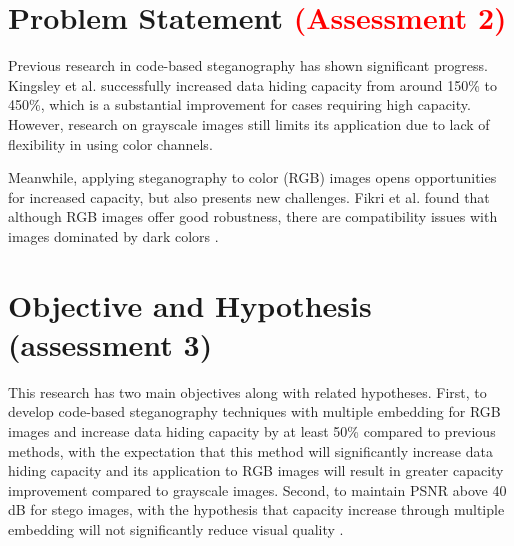 \documentclass{ittelkom}
\begin{document}
\section{Problem Statement \textcolor{red}{(Assessment 2)}} \label{request}

Previous research in code-based steganography has shown significant progress.
Kingsley et al. \cite{kingsley2020improving} successfully increased data hiding
capacity from around 150\% to 450\%, which is a substantial improvement for
cases requiring high capacity. However, research on grayscale images
\cite{soetarmono2012studi} still limits its application due to lack of
flexibility in using color channels.

Meanwhile, applying steganography to color (RGB) images opens opportunities for
increased capacity, but also presents new challenges. Fikri et al.
\cite{fikri2022optimasi} found that although RGB images offer good robustness,
there are compatibility issues with images dominated by dark colors
\cite{juneja2013improved}.

\section{Objective and Hypothesis \color{red}(assessment 3)} \label{hyp}

This research has two main objectives along with related hypotheses. First, to
develop code-based steganography techniques with multiple embedding for RGB
images and increase data hiding capacity by at least 50\% compared to previous
methods, with the expectation that this method will significantly increase data
hiding capacity and its application to RGB images will result in greater
capacity improvement compared to grayscale images. Second, to maintain PSNR
above 40 dB for stego images, with the hypothesis that capacity increase
through multiple embedding will not significantly reduce visual quality
\cite{nasution2018image}.

\end{document}
